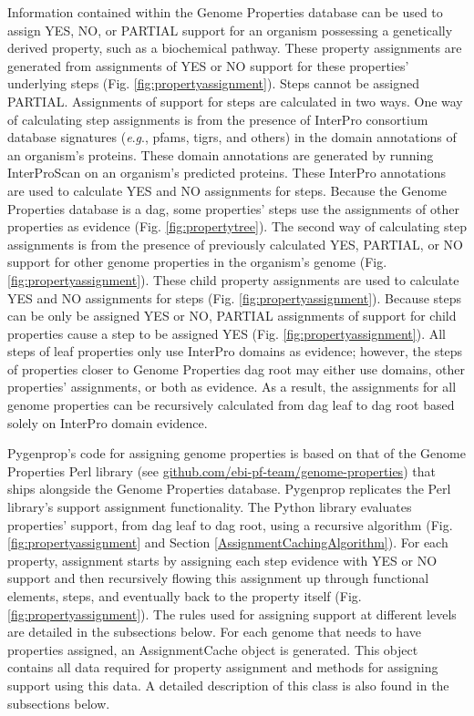 Information contained within the Genome Properties database can be used to 
assign YES, NO, or PARTIAL support for an organism possessing a genetically 
derived property, such as a biochemical pathway. These property assignments are 
generated from assignments of YES or NO support for these properties' underlying 
steps (Fig. \ref{fig:propertyassignment}). Steps cannot be assigned PARTIAL. 
Assignments of support for steps are calculated in two ways. One way of 
calculating step assignments is from the presence of InterPro consortium 
database signatures (\textit{e}.\textit{g}., \gls{pfam}s, \gls{tigr}s, and 
others) in the domain annotations of an organism's proteins. These domain 
annotations are generated by running InterProScan \cite{jones2014interproscan} 
on an organism's predicted proteins. These InterPro annotations are used to 
calculate YES and NO assignments for steps. Because the Genome Properties 
database is a \gls{dag}, some properties' steps use the assignments of other 
properties as evidence (Fig. \ref{fig:propertytree}). The second way of 
calculating step assignments is from the presence of previously calculated YES, 
PARTIAL, or NO support for other genome properties in the organism's genome 
(Fig. \ref{fig:propertyassignment}). These child property assignments are used 
to calculate YES and NO assignments for steps (Fig. 
\ref{fig:propertyassignment}). Because steps can be only be assigned YES or NO, 
PARTIAL assignments of support for child properties cause a step to be assigned 
YES (Fig. \ref{fig:propertyassignment}). All steps of leaf properties only use 
InterPro domains as evidence; however, the steps of properties closer to Genome 
Properties \gls{dag} root may either use domains, other properties' assignments, 
or both as evidence. As a result, the assignments for all genome properties can 
be recursively calculated from \gls{dag} leaf to \gls{dag} root based solely on 
InterPro domain evidence.

Pygenprop’s code for assigning genome properties is based on that of the 
Genome Properties Perl library (see 
\href{http://github.com/ebi-pf-team/genome-properties}{github.com/ebi-pf-team/genome-properties}) 
that ships alongside the Genome Properties database. Pygenprop replicates the 
Perl library’s support assignment functionality. The Python library evaluates 
properties' support, from \gls{dag} leaf to \gls{dag} root, using a recursive 
algorithm (Fig. \ref{fig:propertyassignment} and Section 
\ref{AssignmentCachingAlgorithm}). For each property, assignment 
starts by assigning each step evidence with YES or NO support and then 
recursively flowing this assignment up through functional elements, steps, and 
eventually back to the property itself (Fig. \ref{fig:propertyassignment}). The 
rules used for assigning support at different levels are detailed in the 
subsections below. For each genome that needs to have properties assigned, an 
AssignmentCache object is generated. This object contains all data required for 
property assignment and methods for assigning support using this data. A 
detailed description of this class is also found in the subsections below.

